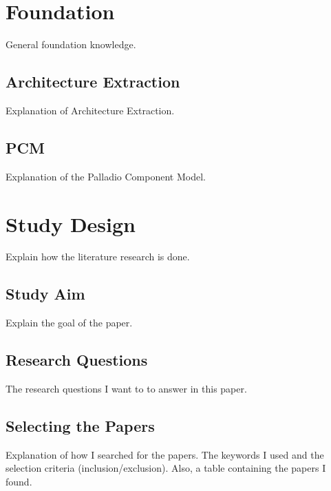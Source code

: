 
\section{Foundation}
\label{ch:Foundation}

General foundation knowledge.

\subsection{Architecture Extraction}
\label{sec:FirstContentSection:FirstSubSubSection}
Explanation of Architecture Extraction.

\subsection{PCM}
\label{sec:FirstContentSection:FirstSubSection}
Explanation of the Palladio Component Model.

\section{Study Design}
\label{sec:SecondContentSection:FirstSubsection}
Explain how the literature research is done.

\subsection{Study Aim}
\label{sec:SecondContentSection:SecondSubsection}
Explain the goal of the paper.

\subsection{Research Questions}
The research questions I want to to answer in this paper.

\subsection{Selecting the Papers}
Explanation of how I searched for the papers. The keywords I used and the selection criteria (inclusion/exclusion).
Also, a table containing the papers I found.


